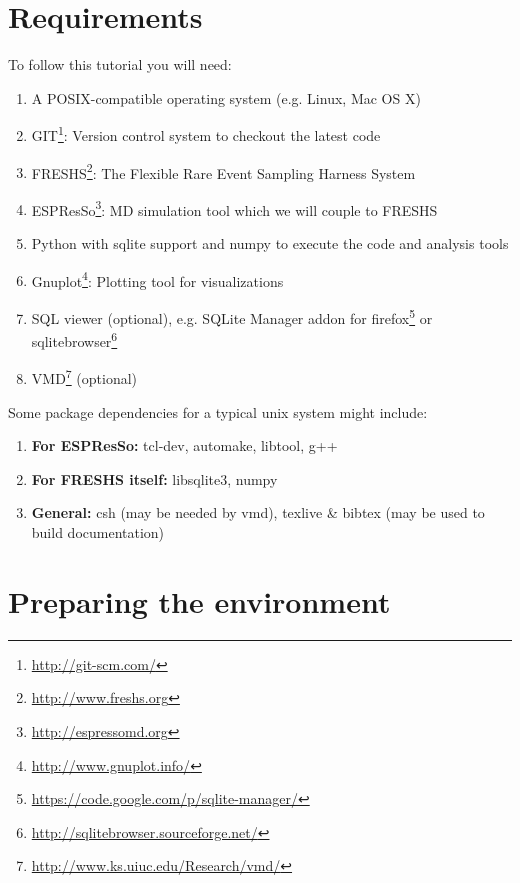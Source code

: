 \documentclass[a4paper,oneside]{article}
\begin{document}
\section{Requirements}

To follow this tutorial you will need:

\begin{enumerate}
\item A POSIX-compatible operating system (e.g. Linux, Mac OS X)
\item GIT\footnote{\url{http://git-scm.com/}}: Version control system to checkout the latest code
\item FRESHS\footnote{\url{http://www.freshs.org}}: The Flexible Rare Event Sampling Harness System
\item ESPResSo\footnote{\url{http://espressomd.org}}: MD simulation tool which we will couple to FRESHS
\item Python with sqlite support and numpy to execute the code and analysis tools
\item Gnuplot\footnote{\url{http://www.gnuplot.info/}}: Plotting tool for visualizations
\item SQL viewer (optional), e.g. SQLite Manager addon for firefox\footnote{\url{https://code.google.com/p/sqlite-manager/}} or sqlitebrowser\footnote{\url{http://sqlitebrowser.sourceforge.net/}}
\item VMD\footnote{\url{http://www.ks.uiuc.edu/Research/vmd/}} (optional) 
\end{enumerate}

Some package dependencies for a typical unix system might include:

\begin{enumerate}
\item {\bf For ESPResSo:} tcl-dev, automake, libtool, g++
\item {\bf For FRESHS itself:} libsqlite3, numpy
\item {\bf General:} csh (may be needed by vmd), texlive \& bibtex (may be used to build documentation) 
\end{enumerate}



\section{Preparing the environment}
\end{document}

